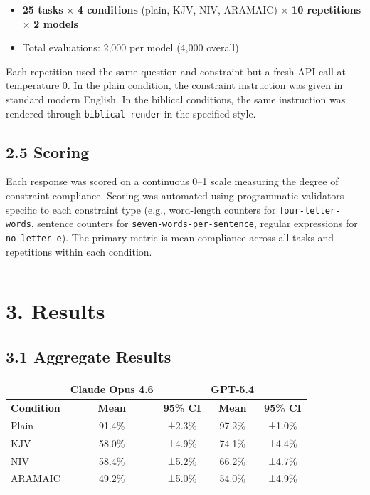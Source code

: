 \documentclass[10pt, letterpaper, twocolumn]{article}
\providecommand{\tightlist}{\setlength{\itemsep}{0pt}\setlength{\parskip}{0pt}}
\begin{document}
\begin{itemize}
\tightlist
\item
  \textbf{25 tasks} × \textbf{4 conditions} (plain, KJV, NIV, ARAMAIC) × \textbf{10 repetitions} × \textbf{2 models}
\item
  Total evaluations: 2,000 per model (4,000 overall)
\end{itemize}

Each repetition used the same question and constraint but a fresh API call at temperature 0. In the plain condition, the constraint instruction was given in standard modern English. In the biblical conditions, the same instruction was rendered through \texttt{biblical-render} in the specified style.

\subsection*{2.5 Scoring}\label{scoring}

Each response was scored on a continuous 0--1 scale measuring the degree of constraint compliance. Scoring was automated using programmatic validators specific to each constraint type (e.g., word-length counters for \texttt{four-letter-words}, sentence counters for \texttt{seven-words-per-sentence}, regular expressions for \texttt{no-letter-e}). The primary metric is mean compliance across all tasks and repetitions within each condition.

\begin{center}\rule{0.5\linewidth}{0.5pt}\end{center}

\section*{3. Results}\label{results}

\subsection*{3.1 Aggregate Results}\label{aggregate-results}

{\def\LTcaptype{none} %
\begin{tabular}[]{@{}lcccc@{}}
\toprule\noalign{}
& Claude Opus 4.6 & & GPT-5.4 & \\
\midrule\noalign{}
\bottomrule\noalign{}
\textbf{Condition} & \textbf{Mean} & \textbf{95\% CI} & \textbf{Mean} & \textbf{95\% CI} \\
Plain & 91.4\% & ±2.3\% & 97.2\% & ±1.0\% \\
KJV & 58.0\% & ±4.9\% & 74.1\% & ±4.4\% \\
NIV & 58.4\% & ±5.2\% & 66.2\% & ±4.7\% \\
ARAMAIC & 49.2\% & ±5.0\% & 54.0\% & ±4.9\% \\
\end{tabular}
}
\end{document}
